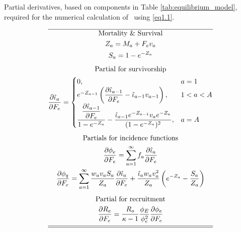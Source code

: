 \begin{tablehere}
  \centering
\caption{Partial derivatives, based on components in Table
\ref{tab:equilibrium_model}, required for the numerical calculation of \fmsy\ using \eqref{eq1.1}.}\label{tab:partial_derivatives} \tableEq
    \begin{gather}
        \hline
        \mbox{Mortality \& Survival} \nonumber \\
        Z_{a}=M_a+F_ev_a                                \label{T3.1} \\
        S_{a}=1-e^{-Z_a}                                \label{T3.2}\\[1ex]
        \mbox{Partial for survivorship} \nonumber \\
        \frac{\partial \hat{\iota}_a}{\partial F_e} =
        \begin{cases}
          0,& a=1                                       \label{T3.3}\\
          e^{-Z_{a-1}}\left(\dfrac{\partial \hat{\iota}_{a-1}}{\partial F_e}
           -\hat{\iota}_{a-1}v_{a-1}\right),& 1<a<A\\
           \dfrac{\dfrac{\partial \hat{\iota}_{a-1}}{\partial F_e}}
           {1-e^{-Z_a}} -
           \dfrac{\hat{\iota}_{a-1} e^{-Z_{a-1}} v_a e^{-Z_a}}
           {(1-e^{-Z_a})^2}, &a=A
        \end{cases} \\[1ex]
        \mbox{Partials for incidence functions} \nonumber \\
        \frac{\partial \phi_e}{\partial F_e}=
            \sum_{a=1}^\infty f_a \frac{\partial \hat{\iota}_a}{\partial
            F_e}                                        \label{T3.4}\\
        \frac{\partial \phi_q}{\partial F_e}=
            \sum_{a=1}^\infty \frac{w_av_a S_a}{Z_a}
             \frac{\partial \hat{\iota}_a}{\partial F_e}
             +\frac{\hat{\iota}_a w_av_a^2}{Z_a}\left(e^{-Z_a}-\frac{S_a}{Z_a} \right)
                                                            \label{T3.5}\\[1ex]
        \mbox{Partial for recruitment} \nonumber\\
        \frac{\partial R_e}{\partial F_e}=\frac{R_o}{\kappa-1}
        \frac{\phi_E}{\phi_e^2} \frac{\partial \phi_e}{\partial
        F_e}                                                \label{T3.6}\\[1ex]
        \hline \hline \nonumber
    \end{gather}

    \normalEq
\end{tablehere}
